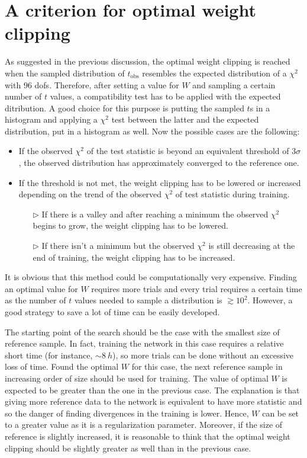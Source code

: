 \section{A criterion for optimal weight clipping}
As suggested in the previous discussion, the optimal weight clipping is reached when the sampled distribution of $t_\mathrm{obs}$ resembles the expected distribution of a $\chi^2$ with 96 dofs. Therefore, after setting a value for $W$ and sampling a certain number of $t$ values, a compatibility test has to be applied with the expected ditribution. A good choice for this purpose is putting the sampled $t$s in a histogram and applying a $\chi^2$ test between the latter and the expected distribution, put in a histogram as well. Now the possible cases are the following:
\begin{itemize}
	\item If the observed $\chi^2$ of the test statistic is beyond an equivalent threshold of $3\sigma$, the observed distribution has approximately converged to the reference one.
	\item If the threshold is not met, the weight clipping has to be lowered or increased depending on the trend of the observed $\chi^2$ of test statistic during training.
	\begin{itemize}
		\item[$\triangleright$] If there is a valley and after reaching a minimum the observed $\chi^2$ begins to grow, the weight clipping has to be lowered.
		\item[$\triangleright$] If there isn't a minimum but the observed $\chi^2$ is still decreasing at the end of training, the weight clipping has to be increased.
	\end{itemize}
\end{itemize}

It is obvious that this method could be computationally very expensive. Finding an optimal value for $W$ requires more trials and every trial requires a certain time as the number of $t$ values needed to sample a distribution is $\gtrsim 10^2$. However, a good strategy to save a lot of time can be easily developed.

The starting point of the search should be the case with the smallest size of reference sample. In fact, training the network in this case requires a relative short time (for instance, $\sim 8~\si{h}$), so more trials can be done without an excessive loss of time. Found the optimal $W$ for this case, the next reference sample in increasing order of size should be used for training. The value of optimal $W$ is expected to be greater than the one in the previous case. The explanation is that giving more reference data to the network is equivalent to have more statistic and so the danger of finding divergences in the training is lower. Hence, $W$ can be set to a greater value as it is a regularization parameter. Moreover, if the size of reference is slightly increased, it is reasonable to think that the optimal weight clipping should be slightly greater as well than in the previous case.





